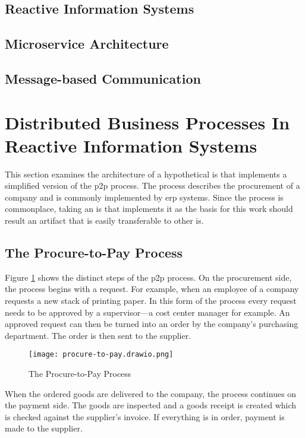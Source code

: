\subsection{Reactive Information Systems}

\subsection{Microservice Architecture}

\subsection{Message-based Communication}

\clearpage
\section{Distributed Business Processes In Reactive Information Systems}\label{sec:problem}

This section examines the architecture of a hypothetical \gls{is} that implements a simplified version of the \gls{p2p} process.
The process describes the procurement of a company and is commonly implemented by \gls{erp} systems.
Since the process is commonplace, taking an \gls{is} that implements it as the basis for this work should result an artifact that is easily transferable to other \gls{is}.

\subsection{The Procure-to-Pay Process}

Figure \ref{fig:procure-to-pay} shows the distinct steps of the \gls{p2p} process.
On the procurement side, the process begins with a request.
For example, when an employee of a company requests a new stack of printing paper.
In this form of the process every request needs to be approved by a supervisor---a cost center manager for example.
An approved request can then be turned into an order by the company's purchasing department.
The order is then sent to the supplier.

\begin{figure}[h]
  \centering
  \texttt{[image: procure-to-pay.drawio.png]}
  \caption{The Procure-to-Pay Process}\label{fig:procure-to-pay}
\end{figure}

When the ordered goods are delivered to the company, the process continues on the payment side.
The goods are inspected and a goods receipt is created which is checked against the supplier's invoice.
If everything is in order, payment is made to the supplier.

